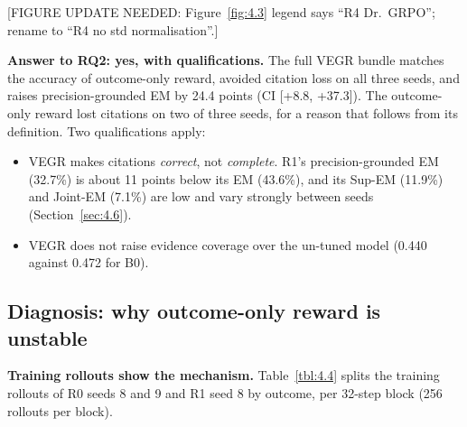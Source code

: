 {[}FIGURE UPDATE NEEDED: Figure~\ref{fig:4.3} legend says ``R4
Dr.~GRPO''; rename to ``R4 no std normalisation''.{]}

\textbf{Answer to RQ2: yes, with qualifications.} The full VEGR bundle
matches the accuracy of outcome-only reward, avoided citation loss on
all three seeds, and raises precision-grounded EM by 24.4 points (CI
{[}+8.8, +37.3{]}). The outcome-only reward lost citations on two of
three seeds, for a reason that follows from its definition. Two
qualifications apply:

\begin{itemize}
\tightlist
\item
  VEGR makes citations \emph{correct}, not \emph{complete}. R1's
  precision-grounded EM (32.7\%) is about 11 points below its EM
  (43.6\%), and its Sup-EM (11.9\%) and Joint-EM (7.1\%) are low and
  vary strongly between seeds (Section~\ref{sec:4.6}).
\item
  VEGR does not raise evidence coverage over the un-tuned model (0.440
  against 0.472 for B0).
\end{itemize}

\subsection{Diagnosis: why outcome-only reward is
unstable}\label{sec:4.5}

\textbf{Training rollouts show the mechanism.} Table~\ref{tbl:4.4}
splits the training rollouts of R0 seeds 8 and 9 and R1 seed 8 by
outcome, per 32-step block (256 rollouts per block).

